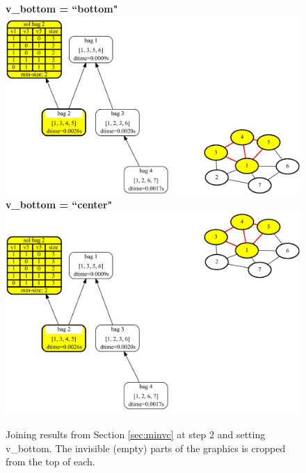 \documentclass[a4paper, 12pt, bibliography=totoc]{scrartcl}
\begin{document}
\begin{figure}[H]
	\centering
	\textbf{v\_bottom = ``bottom"} \vspace{1em}\\
	
	\includegraphics[width=\linewidth]{images/SVGJOIN/default_bottom2.pdf}\\
	\vspace{0.5em}
	\textbf{v\_bottom = ``center"}\\
	
	\vspace{0.6em}
	\includegraphics[width=0.9\linewidth]{images/SVGJOIN/default_center2.pdf}
	\caption{Joining results from Section \ref{sec:minvc} at step 2 and setting v\_bottom. The invisible (empty) parts of the graphics is cropped from the top of each.}
	\label{fig:joinbotcenter}
\end{figure}
\end{document}
